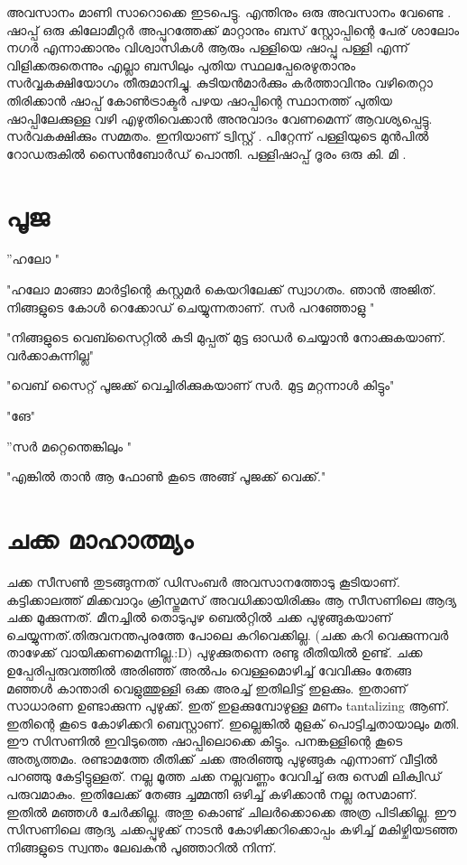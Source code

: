 \documentclass[10pt,a4paper]{report}
\begin{document}
    അവസാനം മാണി സാറൊക്കെ ഇടപെട്ടു. എന്തിനും ഒരു അവസാനം വേണ്ടെ . ഷാപ്പ് ഒരു കിലോമീറ്റർ അപ്പുറത്തേക്ക് മാറ്റാനും ബസ് സ്റ്റോപ്പിന്റെ പേര് ശാലോം നഗർ എന്നാക്കാനും വിശ്വാസികൾ ആരും പള്ളിയെ ഷാപ്പു പള്ളി എന്ന് വിളിക്കരുതെന്നും എല്ലാ ബസിലും പുതിയ സ്ഥലപ്പേരെഴുതാനും സർവ്വകക്ഷിയോഗം തീരുമാനിച്ചു. കുടിയൻമാർക്കും കർത്താവിനും വഴിതെറ്റാ തിരിക്കാൻ ഷാപ്പ് കോൺട്രാക്ടർ പഴയ ഷാപ്പിന്റെ സ്ഥാനത്ത് പുതിയ ഷാപ്പിലേക്കുള്ള വഴി എഴുതിവെക്കാൻ അനുവാദം വേണമെന്ന് ആവശ്യപ്പെട്ടു. സർവകക്ഷിക്കും സമ്മതം. ഇനിയാണ് ട്വിസ്റ്റ് . പിറ്റേന്ന് പള്ളിയുടെ മുൻപിൽ റോഡരുകിൽ സൈൻബോർഡ് പൊന്തി. പള്ളിഷാപ്പ് ദൂരം ഒരു കി. മി .
    
\section{പൂജ}
''ഹലോ "

"ഹലോ മാങ്ങാ മാർട്ടിന്റെ കസ്റ്റമർ കെയറിലേക്ക് സ്വാഗതം. ഞാൻ അജിത്. നിങ്ങളുടെ കോൾ റെക്കോഡ് ചെയ്യുന്നതാണ്‌. സർ പറഞ്ഞോളു "

"നിങ്ങളുടെ വെബ്സൈറ്റിൽ കുടി മുപ്പത് മുട്ട ഓഡർ ചെയ്യാൻ നോക്കുകയാണ്. വർക്കാകുന്നില്ല"

"വെബ് സൈറ്റ് പൂജക്ക് വെച്ചിരിക്കുകയാണ് സർ. മുട്ട മറ്റന്നാൾ കിട്ടും"

"ങേ"

''സർ മറ്റെന്തെങ്കിലും "

"എങ്കിൽ താൻ ആ ഫോൺ കൂടെ അങ്ങ് പൂജക്ക് വെക്ക്."

\section{ചക്ക മാഹാത്മ്യം}
 ചക്ക സീസൺ തുടങ്ങുന്നത് ഡിസംബർ അവസാനത്തോടു കൂടിയാണ്. കട്ടിക്കാലത്ത് മിക്കവാറും ക്രിസ്തുമസ് അവധിക്കായിരിക്കും ആ സീസണിലെ ആദ്യ ചക്ക മൂക്കുന്നത്. മീനച്ചിൽ തൊടുപുഴ ബെൽറ്റിൽ ചക്ക പുഴുങ്ങുകയാണ് ചെയ്യുന്നത്.തിരുവനന്തപുരത്തേ പോലെ കറിവെക്കില്ല. (ചക്ക കറി വെക്കുന്നവർ താഴേക്ക് വായിക്കണമെന്നില്ല.:D) പുഴുക്കുതന്നെ രണ്ടു രീതിയിൽ ഉണ്ട്. ചക്ക ഉപ്പേരിപ്പരുവത്തിൽ അരിഞ്ഞ് അൽപം വെള്ളമൊഴിച്ച് വേവിക്കും തേങ്ങ മഞ്ഞൾ കാന്താരി വെളുത്തുള്ളി ഒക്ക അരച്ച് ഇതിലിട്ട് ഇളക്കും. ഇതാണ് സാധാരണ ഉണ്ടാക്കുന്ന പുഴുക്ക്. ഇത് ഇളക്കുമ്പോഴുള്ള മണം tantalizing ആണ്. ഇതിന്റെ കൂടെ കോഴിക്കറി ബെസ്റ്റാണ്. ഇല്ലെങ്കിൽ മുളക് പൊട്ടിച്ചതായാലും മതി. ഈ സിസണിൽ ഇവിടുത്തെ ഷാപ്പിലൊക്കെ കിട്ടും. പനങ്കള്ളിന്റെ കൂടെ അത്യത്തമം. രണ്ടാമത്തേ രീതിക്ക് ചക്ക അരിഞ്ഞു പുഴുങ്ങുക എന്നാണ് വീട്ടിൽ പറഞ്ഞു കേട്ടിട്ടുള്ളത്. നല്ല മൂത്ത ചക്ക നല്ലവണ്ണം വേവിച്ച് ഒരു സെമി ലിക്വിഡ് പരുവമാകും. ഇതിലേക്ക് തേങ്ങ ച്ചമ്മന്തി ഒഴിച്ച് കഴിക്കാൻ നല്ല രസമാണ്. ഇതിൽ മഞ്ഞൾ ചേർക്കില്ല. അതു കൊണ്ട് ചിലർക്കൊക്കെ അത്ര പിടിക്കില്ല. ഈ സിസണിലെ ആദ്യ ചക്കപ്പുഴുക്ക് നാടൻ കോഴിക്കറിക്കൊപ്പം കഴിച്ച് മകിഴ്ചിയടഞ്ഞ നിങ്ങളുടെ സ്വന്തം ലേഖകൻ പൂഞ്ഞാറിൽ നിന്ന്.
\end{document}
